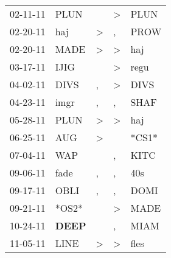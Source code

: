 \begin{supertabular}{p{0.07\textwidth}p{0.06\textwidth}p{0.02\textwidth}p{0.02\textwidth}p{0.06\textwidth}}
          02-11-11\textsuperscript{} &           PLUN\textsuperscript{} &                  &     \textgreater &           PLUN\textsuperscript{} \\
          02-20-11\textsuperscript{} &            haj\textsuperscript{} &     \textgreater &                , &           PROW\textsuperscript{} \\
          02-20-11\textsuperscript{} &           MADE\textsuperscript{} &     \textgreater &     \textgreater &            haj\textsuperscript{} \\
          03-17-11\textsuperscript{} &           IJIG\textsuperscript{} &                  &     \textgreater &           regu\textsuperscript{} \\
          04-02-11\textsuperscript{} &           DIVS\textsuperscript{} &                , &     \textgreater &           DIVS\textsuperscript{} \\
          04-23-11\textsuperscript{} &           imgr\textsuperscript{} &                , &                , &           SHAF\textsuperscript{} \\
          05-28-11\textsuperscript{} &           PLUN\textsuperscript{} &     \textgreater &     \textgreater &            haj\textsuperscript{} \\
          06-25-11\textsuperscript{} &            AUG\textsuperscript{} &     \textgreater &                  &                            *CS1* \\
          07-04-11\textsuperscript{} &            WAP\textsuperscript{} &                  &                , &           KITC\textsuperscript{} \\
          09-06-11\textsuperscript{} &           fade\textsuperscript{} &                , &                , &            40s\textsuperscript{} \\
          09-17-11\textsuperscript{} &           OBLI\textsuperscript{} &                , &                , &           DOMI\textsuperscript{} \\
          09-21-11\textsuperscript{} &                            *OS2* &                  &     \textgreater &           MADE\textsuperscript{} \\
          10-24-11\textsuperscript{} &  \textbf{DEEP\textsuperscript{}} &                  &                , &           MIAM\textsuperscript{} \\
          11-05-11\textsuperscript{} &           LINE\textsuperscript{} &     \textgreater &     \textgreater &           fles\textsuperscript{} \\

\end{supertabular}
